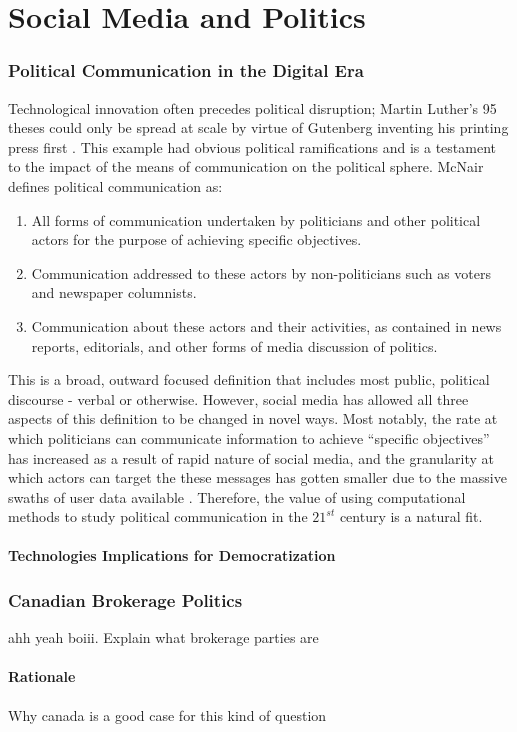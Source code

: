 \chapter{Social Media and Politics}\label{ch:SMandPolitics}

\subsection{Political Communication in the Digital Era}

Technological innovation often precedes political disruption; Martin Luther’s 95 theses could only be spread at scale by virtue of Gutenberg inventing his printing press first \cite{gardels2019renovating}. 
This example had obvious political ramifications and is a testament to the impact of the means of communication on the political sphere. McNair defines political communication as:
\begin{enumerate}
    \item All forms of communication undertaken by politicians and other political actors for the purpose of achieving specific objectives.
    \item Communication addressed to these actors by non-politicians such as voters and newspaper columnists.
    \item Communication about these actors and their activities, as contained in news reports, editorials, and other forms of media discussion of politics. \cite{mcnair2017introduction}
  \end{enumerate} 
This is a broad, outward focused definition that includes most public, political discourse - verbal or otherwise. 
However, social media has allowed all three aspects of this definition to be changed in novel ways. 
Most notably, the rate at which politicians can communicate information to achieve “specific objectives” has increased as a result of rapid nature of social media, and the granularity at which actors can target the these messages has gotten smaller due to the massive swaths of user data available \cite{nickerson2014political}.
Therefore, the value of using computational methods to study political communication in the  $21^{st}$ century is a natural fit.

\subsubsection{Technologies Implications for Democratization}


\subsection{Canadian Brokerage Politics}

ahh yeah boiii. Explain what brokerage parties are

\subsubsection{Rationale}

Why canada is a good case for this kind of question